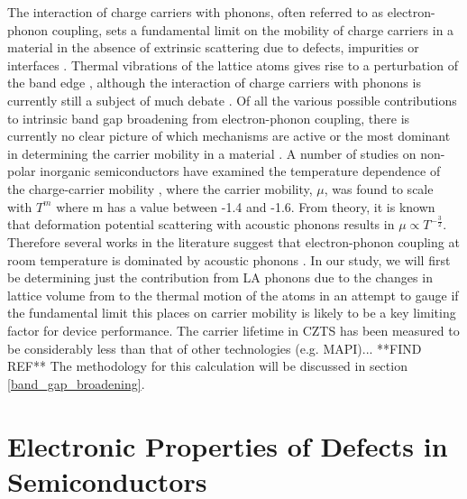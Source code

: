 The interaction of charge carriers with phonons, often referred to as electron-phonon coupling, sets a fundamental limit on the mobility of charge carriers in a material in the absence of extrinsic scattering due to defects, impurities or interfaces \cite{fund_semi, MAPI_Eg_broadening}. Thermal vibrations of the lattice atoms gives rise to a perturbation of the band edge \cite{thin_film_Boer}, although the interaction of charge carriers with phonons is currently still a subject of much debate \cite{MAPI_Eg_broadening16, MAPI_Eg_broadening17, MAPI_Eg_broadening}.
Of all the various possible contributions to intrinsic band gap broadening from electron-phonon coupling, there is currently no clear picture of which mechanisms are active or the most dominant in determining the carrier mobility in a material \cite{MAPI_Eg_broadening}. A number of studies on non-polar inorganic semiconductors have examined the temperature dependence of the charge-carrier mobility \cite{MAPI_Eg_broadening21, MAPI_Eg_broadening22, MAPI_Eg_broadening23, MAPI_Eg_broadening24}, where the carrier mobility, $\mu$, was found to scale with $T^m$ where m has a value between -1.4 and -1.6. From theory, it is known that deformation potential scattering with acoustic phonons results in $\mu \propto T^{-\frac{3}{2}}$. Therefore several works in the literature suggest that electron-phonon coupling at room temperature is dominated by acoustic phonons \cite{MAPI_Eg_broadening16, MAPI_Eg_broadening17, MAPI_Eg_broadening24}.
In our study, we will first be determining just the contribution from LA phonons due to the changes in lattice volume from to the thermal motion of the atoms in an attempt to gauge if the fundamental limit this places on carrier mobility is likely to be a key limiting factor for device performance. The carrier lifetime in CZTS has been measured to be considerably less than that of other technologies (e.g. MAPI)... **FIND REF** The methodology for this calculation will be discussed in section \ref{band_gap_broadening}.
 
\section{Electronic Properties of Defects in Semiconductors}

